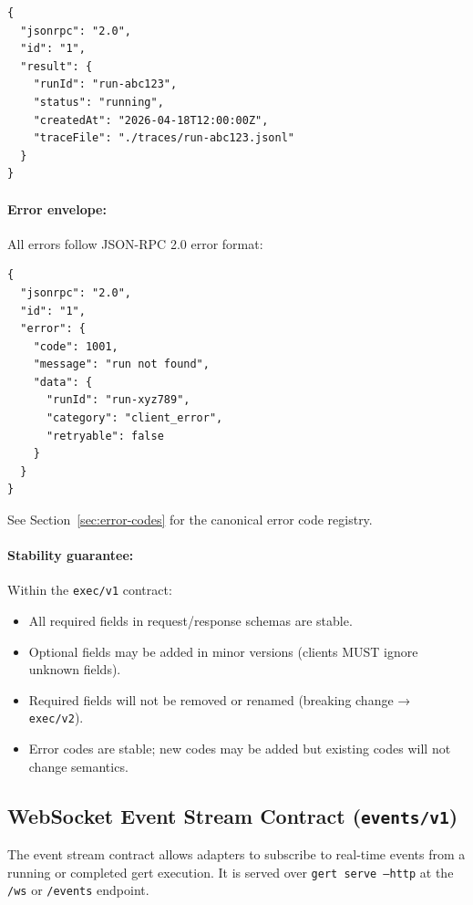 \begin{verbatim}
{
  "jsonrpc": "2.0",
  "id": "1",
  "result": {
    "runId": "run-abc123",
    "status": "running",
    "createdAt": "2026-04-18T12:00:00Z",
    "traceFile": "./traces/run-abc123.jsonl"
  }
}
\end{verbatim}

\paragraph{Error envelope:}

All errors follow JSON-RPC 2.0 error format:

\begin{verbatim}
{
  "jsonrpc": "2.0",
  "id": "1",
  "error": {
    "code": 1001,
    "message": "run not found",
    "data": {
      "runId": "run-xyz789",
      "category": "client_error",
      "retryable": false
    }
  }
}
\end{verbatim}

See Section~\ref{sec:error-codes} for the canonical error code registry.

\paragraph{Stability guarantee:}

Within the \texttt{exec/v1} contract:

\begin{itemize}
  \item All required fields in request/response schemas are stable.
  \item Optional fields may be added in minor versions (clients MUST ignore
        unknown fields).
  \item Required fields will not be removed or renamed (breaking change →
        \texttt{exec/v2}).
  \item Error codes are stable; new codes may be added but existing codes will
        not change semantics.
\end{itemize}

\subsection{WebSocket Event Stream Contract (\texttt{events/v1})}
\label{sec:ws-event-contract}

The event stream contract allows adapters to subscribe to real-time events from
a running or completed gert execution.  It is served over \texttt{gert serve
--http} at the \texttt{/ws} or \texttt{/events} endpoint.

